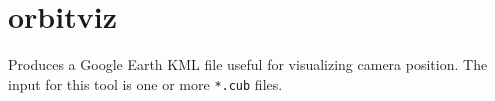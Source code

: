 


\section{orbitviz}
\label{orbitviz}

Produces a Google Earth \ac{KML} file useful for visualizing camera
position. The input for this tool is one or more \texttt{*.cub} files.

